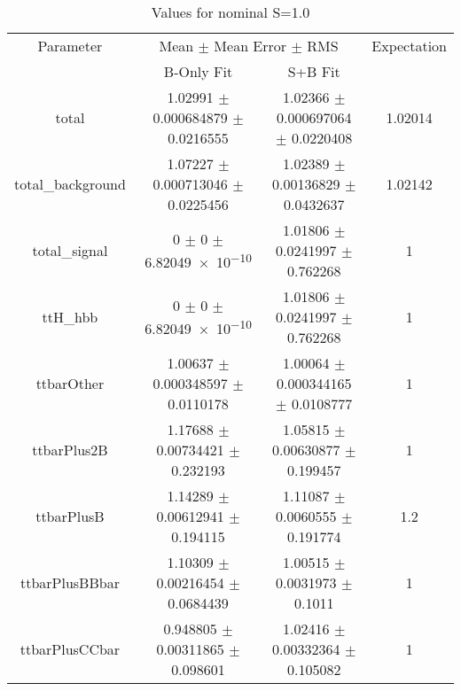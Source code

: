 \begin{table}
\centering
\caption{Values for nominal S=1.0}
\begin{tabular}{cccc}
\toprule
Parameter & \multicolumn{2}{c}{Mean $\pm$ Mean Error $\pm$ RMS} & Expectation\\
 & B-Only Fit & S+B Fit & \\
\midrule
total & \num{1.02991} $\pm$ \num{0.000684879} $\pm$ \num{0.0216555} & \num{1.02366} $\pm$ \num{0.000697064} $\pm$ \num{0.0220408} & \num{1.02014}\\
total\_background & \num{1.07227} $\pm$ \num{0.000713046} $\pm$ \num{0.0225456} & \num{1.02389} $\pm$ \num{0.00136829} $\pm$ \num{0.0432637} & \num{1.02142}\\
total\_signal & \num{0} $\pm$ \num{0} $\pm$ \num{6.82049e-10} & \num{1.01806} $\pm$ \num{0.0241997} $\pm$ \num{0.762268} & \num{1}\\
ttH\_hbb & \num{0} $\pm$ \num{0} $\pm$ \num{6.82049e-10} & \num{1.01806} $\pm$ \num{0.0241997} $\pm$ \num{0.762268} & \num{1}\\
ttbarOther & \num{1.00637} $\pm$ \num{0.000348597} $\pm$ \num{0.0110178} & \num{1.00064} $\pm$ \num{0.000344165} $\pm$ \num{0.0108777} & \num{1}\\
ttbarPlus2B & \num{1.17688} $\pm$ \num{0.00734421} $\pm$ \num{0.232193} & \num{1.05815} $\pm$ \num{0.00630877} $\pm$ \num{0.199457} & \num{1}\\
ttbarPlusB & \num{1.14289} $\pm$ \num{0.00612941} $\pm$ \num{0.194115} & \num{1.11087} $\pm$ \num{0.0060555} $\pm$ \num{0.191774} & \num{1.2}\\
ttbarPlusBBbar & \num{1.10309} $\pm$ \num{0.00216454} $\pm$ \num{0.0684439} & \num{1.00515} $\pm$ \num{0.0031973} $\pm$ \num{0.1011} & \num{1}\\
ttbarPlusCCbar & \num{0.948805} $\pm$ \num{0.00311865} $\pm$ \num{0.098601} & \num{1.02416} $\pm$ \num{0.00332364} $\pm$ \num{0.105082} & \num{1}\\
\bottomrule
\end{tabular}
\end{table}